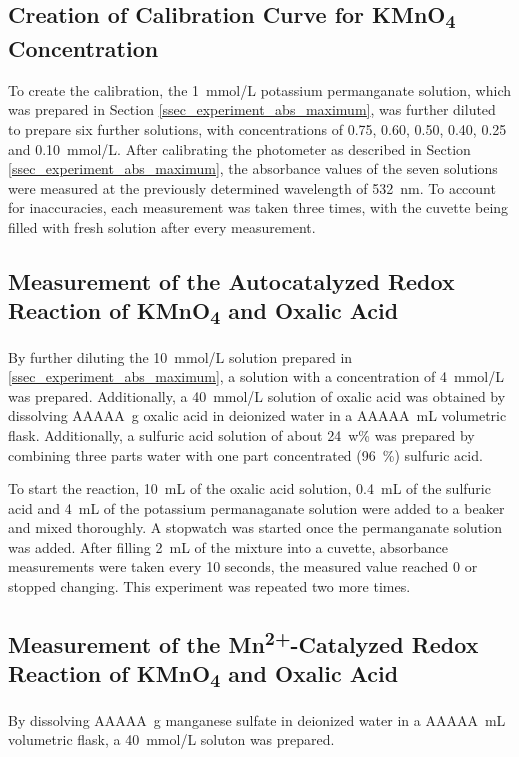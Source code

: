 \documentclass[titlepage]{article}
\begin{document}
\subsection{Creation of Calibration Curve for KMnO\texorpdfstring{\textsubscript{4}}{4} Concentration}
To create the calibration, the 1~mmol/L potassium permanganate solution, which was prepared in Section \ref{ssec_experiment_abs_maximum}, was further diluted to prepare six further solutions, with concentrations of 0.75, 0.60, 0.50, 0.40, 0.25 and 0.10~mmol/L. After calibrating the photometer as described in Section \ref{ssec_experiment_abs_maximum}, the absorbance values of the seven solutions were measured at the previously determined wavelength of 532~nm. To account for inaccuracies, each measurement was taken three times, with the cuvette being filled with fresh solution after every measurement.

\subsection{Measurement of the Autocatalyzed Redox Reaction of KMnO\texorpdfstring{\textsubscript{4}}{4} and Oxalic Acid} \label{ssec_experiment_reaction_autocatalyzed}
By further diluting the 10~mmol/L solution prepared in \ref{ssec_experiment_abs_maximum}, a solution with a concentration of 4~mmol/L was prepared. Additionally, a 40~mmol/L solution of oxalic acid was obtained by dissolving AAAAA~g oxalic acid in deionized water in a AAAAA~mL volumetric flask. Additionally, a sulfuric acid solution of about 24~w\% was prepared by combining three parts water with one part concentrated (96~\%) sulfuric acid.

To start the reaction, 10~mL of the oxalic acid solution, 0.4~mL of the sulfuric acid and 4~mL of the potassium permanaganate solution were added to a beaker and mixed thoroughly. A stopwatch was started once the permanganate solution was added. After filling 2~mL of the mixture into a cuvette, absorbance measurements were taken every 10 seconds, the measured value reached 0 or stopped changing. This experiment was repeated two more times.

\subsection{Measurement of the Mn\texorpdfstring{\textsuperscript{2+}}{2+}-Catalyzed Redox Reaction of KMnO\texorpdfstring{\textsubscript{4}}{4} and Oxalic Acid}
By dissolving AAAAA~g manganese sulfate in deionized water in a AAAAA~mL volumetric flask, a 40~mmol/L soluton was prepared.
\end{document}
